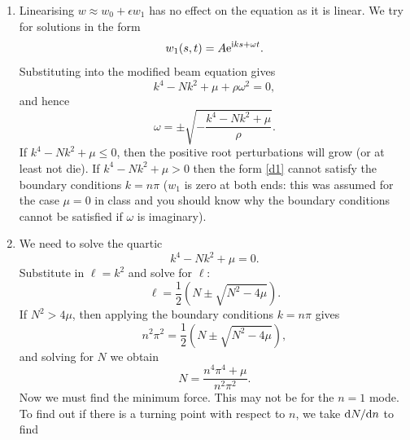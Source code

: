 \documentclass[a4paper, 12pt]{article}
\begin{document}
\begin{enumerate}[label={\bf \arabic{*}.\;}, ref={\arabic{*}},itemsep=3ex, left=0ex]
{\begin{enumerate}[label=(\alph*)]
      \end{enumerate}
    }
    {
      \begin{enumerate}[label=(\alph*)]
        \item{
            Linearising $w \approx w_0 + \epsilon w_1$ has no effect on the equation as it is linear. We try for solutions in the form
            \begin{equation}
              \label{d1}
              w_1(s,t) = A\mathrm{e} ^{\mathrm{i} ks + \omega t}.
            \end{equation}
            Substituting into the modified beam equation gives
            \begin{equation}
              k^4 - N k^2 +\mu  + \rho\omega^2 =0,
            \end{equation}
            and hence
            \begin{equation}
              \omega = \pm \sqrt{-\frac{k^4 - N k^2 +\mu}{\rho}}.
            \end{equation}
            If $k^4 -N k^2 + \mu\leq 0$, then the positive root perturbations will grow (or at least not die). If $k^4 -N k^2 +\mu>0$ then the form \cref{d1} cannot satisfy the boundary conditions $k=n\pi$ ($w_1$ is zero at both ends: this was assumed for the case $\mu =0$ in class and you should know why the boundary conditions cannot be satisfied if $\omega$ is imaginary).
          }
        \item{
            We need to solve the quartic
            \begin{equation}
              k^4 - N k^2 +\mu = 0.
            \end{equation}
            Substitute in $\ell = k^2$ and solve for $\ell$:
            \begin{equation}
              \ell  =\frac{1}{2}\left(N \pm \sqrt{N^2-4\mu}\right).
            \end{equation}
            If $N^2>4\mu$, then applying the boundary conditions $k=n\pi$ gives
            \begin{equation}
              n^2\pi^2 =\frac{1}{2}(N \pm\sqrt{N^2-4\mu}),
            \end{equation}
            and solving for $N$ we obtain
            \begin{equation}
              N = \frac{n^4\pi^4+\mu}{n^2\pi^2}.
            \end{equation}
            Now we must find the minimum force. This may not be for the $n=1$ mode. To find out if there is a turning point with respect to $n$, we take $\fd{N}{n}$ to find
}
\end{enumerate}}
\end{enumerate}
\end{document}
